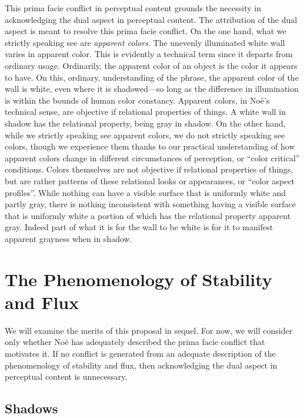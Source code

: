 \documentclass[12pt]{article}
\begin{document}
This prima facie conflict in perceptual content grounds the necessity in acknowledging the dual aspect in perceptual content. The attribution of the dual aspect is meant to resolve this prima facie conflict. On the one hand, what we strictly speaking see are \emph{apparent colors}. The unevenly illuminated white wall varies in apparent color. This is evidently a technical term since it departs from ordinary usage. Ordinarily, the apparent color of an object is the color it appears to have. On this, ordinary, understanding of the phrase, the apparent color of the wall is white, even where it is shadowed---so long as the difference in illumination is within the bounds of human color constancy. Apparent colors, in Noë's technical sense, are objective if relational properties of things. A white wall in shadow has the relational property, being gray in shadow. On the other hand, while we strictly speaking see apparent colors, we do not strictly speaking see colors, though we experience them thanks to our practical understanding of how apparent colors change in different circumstances of perception, or ``color critical'' conditions. Colors themselves are not objective if relational properties of things, but are rather patterns of these relational looks or appearances, or ``color aspect profiles''. While nothing can have a visible surface that is uniformly white and partly gray, there is nothing inconsistent with something having a visible surface that is uniformly white a portion of which has the relational property apparent gray. Indeed part of what it is for the wall to be white is for it to manifest apparent grayness when in shadow.


\section{The Phenomenology of Stability and Flux}\label{sec:stability_and_flux} %

We will examine the merits of this proposal in sequel. For now, we will consider only whether Noë has adequately described the prima facie conflict that motivates it. If no conflict is generated from an adequate description of the phenomenology of stability and flux, then acknowledging the dual aspect in perceptual content is unnecessary.

\subsection{Shadows} %
\label{sub:shadows}
\end{document}
